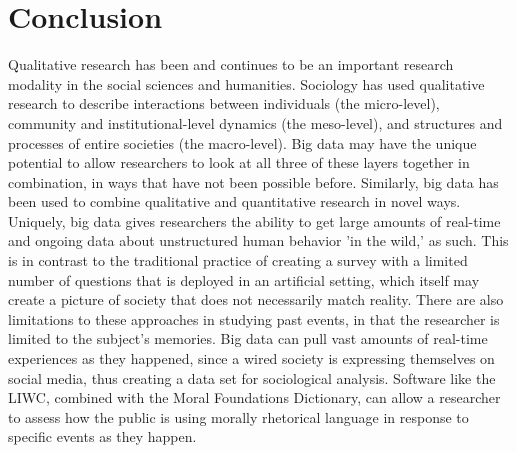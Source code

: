 \documentclass[sigconf]{acmart}
\begin{document}
\section{Conclusion}
Qualitative research has been and continues to be an important research modality in the social sciences and humanities.  Sociology has used qualitative research to describe interactions between individuals (the micro-level), community and institutional-level dynamics (the meso-level), and structures and processes of entire societies (the macro-level).  Big data may have the unique potential to allow researchers to look at all three of these layers together in combination, in ways that have not been possible before. Similarly, big data has been used to combine qualitative and quantitative research in novel ways.  Uniquely, big data gives researchers the ability to get large amounts of real-time and ongoing data about unstructured human behavior 'in the wild,' as such.  This is in contrast to the traditional practice of creating a survey with a limited number of questions that is deployed in an artificial setting, which itself may create a picture of society that does not necessarily match reality.  There are also limitations to these approaches in studying past events, in that the researcher is limited to the subject's memories.  Big data can pull vast amounts of real-time experiences as they happened, since a wired society is expressing themselves on social media, thus creating a data set for sociological analysis.  Software like the LIWC, combined with the Moral Foundations Dictionary, can allow a researcher to assess how the public is using morally rhetorical language in response to specific events as they happen.



 
\end{document}
